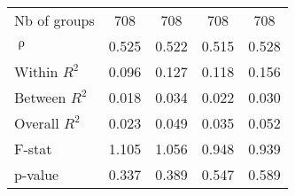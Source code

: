 \begin{table}[htbp]
{\begin{tabular}{lcccc}
    Nb of groups & 708   & 708   & 708   & 708 \\
    $\uprho$ & 0.525 & 0.522 & 0.515 & 0.528 \\
    Within $R^2$ & 0.096 & 0.127 & 0.118 & 0.156 \\
    Between $R^2$ & 0.018 & 0.034 & 0.022 & 0.030 \\
    Overall $R^2$ & 0.023 & 0.049 & 0.035 & 0.052 \\
    F-stat & 1.105 & 1.056 & 0.948 & 0.939 \\
    p-value & 0.337 & 0.389 & 0.547 & 0.589 \\
    \bottomrule
    \end{tabular}%
    }
  \label{tab:addlabel}%
\end{table}%
